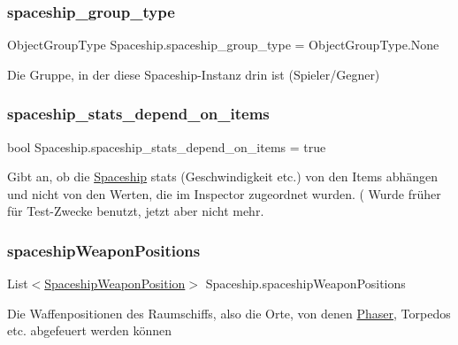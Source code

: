 \subsubsection{\texorpdfstring{spaceship\+\_\+group\+\_\+type}{spaceship\_group\_type}}
{\footnotesize\ttfamily Object\+Group\+Type Spaceship.\+spaceship\+\_\+group\+\_\+type = Object\+Group\+Type.\+None}



Die Gruppe, in der diese Spaceship-\/\+Instanz drin ist (Spieler/\+Gegner) 

\mbox{\label{class_spaceship_acdd2d51050e8368133ae24362d7b2ddf}} 
\subsubsection{\texorpdfstring{spaceship\+\_\+stats\+\_\+depend\+\_\+on\+\_\+items}{spaceship\_stats\_depend\_on\_items}}
{\footnotesize\ttfamily bool Spaceship.\+spaceship\+\_\+stats\+\_\+depend\+\_\+on\+\_\+items = true}



Gibt an, ob die \hyperlink{class_spaceship}{Spaceship} stats (Geschwindigkeit etc.) von den Items abhängen und nicht von den Werten, die im Inspector zugeordnet wurden. ( Wurde früher für Test-\/\+Zwecke benutzt, jetzt aber nicht mehr. 

\mbox{\label{class_spaceship_a3da1d2ff9be863bb80ea7fa2a6c3db06}} 
\subsubsection{\texorpdfstring{spaceship\+Weapon\+Positions}{spaceshipWeaponPositions}}
{\footnotesize\ttfamily List$<$\hyperlink{class_spaceship_weapon_position}{Spaceship\+Weapon\+Position}$>$ Spaceship.\+spaceship\+Weapon\+Positions}



Die Waffenpositionen des Raumschiffs, also die Orte, von denen \hyperlink{class_phaser}{Phaser}, Torpedos etc. abgefeuert werden können 

